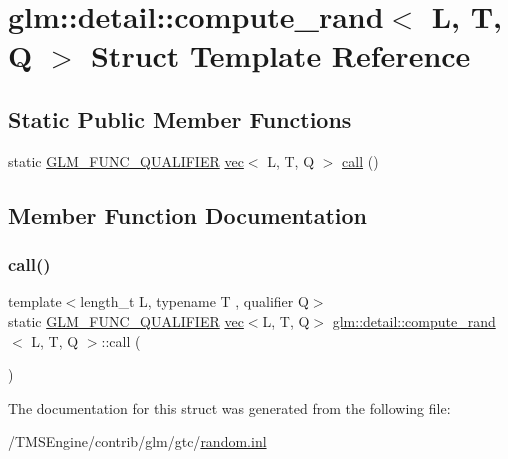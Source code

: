 \hypertarget{structglm_1_1detail_1_1compute__rand}{}\section{glm\+:\+:detail\+:\+:compute\+\_\+rand$<$ L, T, Q $>$ Struct Template Reference}
\label{structglm_1_1detail_1_1compute__rand}
\subsection*{Static Public Member Functions}
\begin{DoxyCompactItemize}
\item 
static \hyperlink{setup_8hpp_a33fdea6f91c5f834105f7415e2a64407}{G\+L\+M\+\_\+\+F\+U\+N\+C\+\_\+\+Q\+U\+A\+L\+I\+F\+I\+ER} \hyperlink{structglm_1_1vec}{vec}$<$ L, T, Q $>$ \hyperlink{structglm_1_1detail_1_1compute__rand_a7c4855eeb77b83d066abf7ffc1398724}{call} ()
\end{DoxyCompactItemize}


\subsection{Member Function Documentation}
\mbox{\label{structglm_1_1detail_1_1compute__rand_a7c4855eeb77b83d066abf7ffc1398724}} 
\subsubsection{\texorpdfstring{call()}{call()}}
{\footnotesize\ttfamily template$<$length\+\_\+t L, typename T , qualifier Q$>$ \\
static \hyperlink{setup_8hpp_a33fdea6f91c5f834105f7415e2a64407}{G\+L\+M\+\_\+\+F\+U\+N\+C\+\_\+\+Q\+U\+A\+L\+I\+F\+I\+ER} \hyperlink{structglm_1_1vec}{vec}$<$L, T, Q$>$ \hyperlink{structglm_1_1detail_1_1compute__rand}{glm\+::detail\+::compute\+\_\+rand}$<$ L, T, Q $>$\+::call (\begin{DoxyParamCaption}{ }\end{DoxyParamCaption})\hspace{0.3cm}{\ttfamily [static]}}



The documentation for this struct was generated from the following file\+:\begin{DoxyCompactItemize}
\item 
/\+T\+M\+S\+Engine/contrib/glm/gtc/\hyperlink{random_8inl}{random.\+inl}\end{DoxyCompactItemize}
